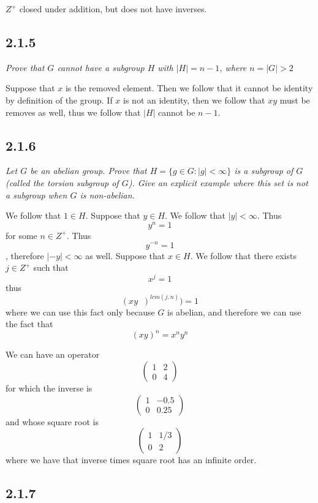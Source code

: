 \documentclass[11pt,oneside,titlepage]{book}
\DeclareMathOperator \inv {^{-1}}
\begin{document}
$Z^+$ closed under addition, but does not have inverses.

\subsection*{2.1.5}

\textit{Prove that $G$ cannot have a subgroup $H$ with $|H| = n - 1$, where $n = |G| > 2$}

Suppose that $x$ is the removed element. Then we follow that it cannot be identity by definition
of the group. If $x$ is not an identity, then we follow that $xy $ must be removes as well,
thus we follow that $|H|$ cannot be $n - 1$.

\subsection*{2.1.6}

\textit{Let $G$ be an abelian group. Prove that $H = \{g \in G: |g| < \infty\}$ is a subgroup
  of $G$ (called the torsion subgroup of $G$). Give an explicit example where
  this set is not a subgroup when $G$ is non-abelian.}

We follow that $1 \in H$. Suppose that $y \in H$. We follow that $|y| < \infty$. Thus
$$y^n = 1$$ for some $n \in Z^+$. Thus $$y^{-n} = 1$$, therefore $|-y| < \infty$ as well.
Suppose that $x \in H$. We follow that there exists $j \in Z^+$ such that
$$x^j = 1$$
thus 
$$(xy{\inv})^{lcm(j, n)}) = 1$$
where we can use this fact only because $G$ is abelian, and therefore we can use the fact that
$$(xy)^n = x^n y^n$$

We can have an operator
$$
\begin{pmatrix}
  1 & 2 \\
  0 & 4
\end{pmatrix}
$$
for which the inverse is
$$
\begin{pmatrix}
  1 & -0.5 \\
  0 & 0.25
\end{pmatrix}
$$
and whose square root is
$$
\begin{pmatrix}
  1 & 1/3 \\
  0 & 2
\end{pmatrix}
$$
where we have that inverse times square root has an infinite order.

\subsection*{2.1.7}
\end{document}

